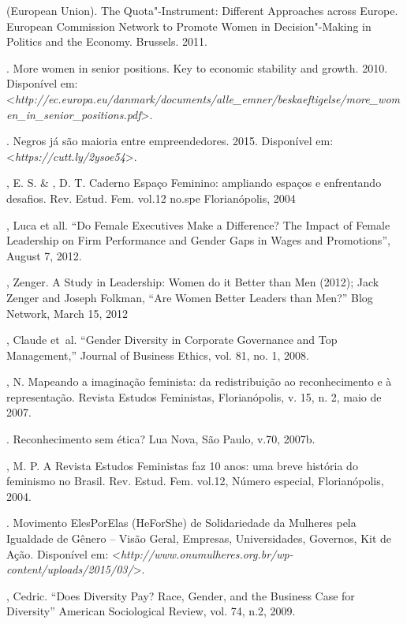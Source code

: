 \begin{bibliohedra}
\mbox{} (European Union). The Quota"-Instrument: Different Approaches across
Europe. European Commission Network to Promote Women in Decision"-Making
in Politics and the Economy. Brussels. 2011.

\titidem. More women in senior positions. Key to economic
stability and growth. 2010.
Disponível em: \textless{}\emph{http://ec.europa.eu/danmark/documents/alle\_emner/beskaeftigelse/more\_women\_in\_senior\_positions.pdf}\textgreater{}.

. Negros já são maioria entre empreendedores. 2015.
Disponível em: \textless{}\emph{https://cutt.ly/2ysoe54}\textgreater{}.

, E. S. \& , D. T. Caderno Espaço Feminino: ampliando
espaços e enfrentando desafios. Rev. Estud. Fem. vol.12 no.spe
Florianópolis, 2004

, Luca et all. ``Do Female Executives Make a Difference? The
Impact of Female Leadership on Firm Performance and Gender Gaps in Wages
and Promotions'', August 7, 2012.

, Zenger. A Study in Leadership: Women do it Better than Men
(2012); Jack Zenger and Joseph Folkman, ``Are Women Better Leaders than
Men?''  Blog Network, March 15, 2012

, Claude et~al. ``Gender Diversity in Corporate Governance and
Top Management,'' Journal of Business Ethics, vol. 81, no. 1, 2008.

, N. Mapeando a imaginação feminista: da redistribuição ao
reconhecimento e à representação. Revista Estudos Feministas,
Florianópolis, v. 15, n. 2, maio de 2007.

\titidem. Reconhecimento sem ética? Lua Nova, São Paulo, v.70,
2007b.

, M. P. A Revista Estudos Feministas faz 10 anos: uma breve
história do feminismo no Brasil. Rev. Estud. Fem. vol.12, Número
especial, Florianópolis, 2004.

. Movimento ElesPorElas (HeForShe) de Solidariedade da 
Mulheres pela Igualdade de Gênero -- Visão Geral, Empresas,
Universidades, Governos, Kit de Ação.
Disponível em: \textless{}\emph{http://www.onumulheres.org.br/wp-content/uploads/2015/03/}\textgreater{}.

, Cedric. ``Does Diversity Pay? Race, Gender, and the Business
Case for Diversity'' American Sociological Review, vol. 74, n.2, 2009.


\end{bibliohedra}
